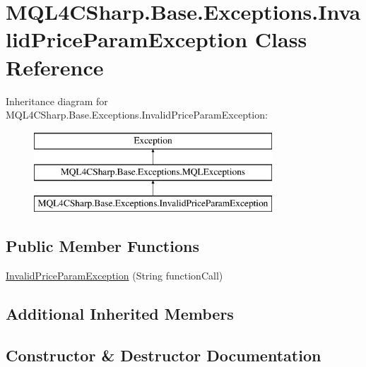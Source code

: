 \hypertarget{class_m_q_l4_c_sharp_1_1_base_1_1_exceptions_1_1_invalid_price_param_exception}{}\section{M\+Q\+L4\+C\+Sharp.\+Base.\+Exceptions.\+Invalid\+Price\+Param\+Exception Class Reference}
\label{class_m_q_l4_c_sharp_1_1_base_1_1_exceptions_1_1_invalid_price_param_exception}
Inheritance diagram for M\+Q\+L4\+C\+Sharp.\+Base.\+Exceptions.\+Invalid\+Price\+Param\+Exception\+:\begin{figure}[H]
\begin{center}
\leavevmode
\includegraphics[height=3.000000cm]{class_m_q_l4_c_sharp_1_1_base_1_1_exceptions_1_1_invalid_price_param_exception}
\end{center}
\end{figure}
\subsection*{Public Member Functions}
\begin{DoxyCompactItemize}
\item 
\hyperlink{class_m_q_l4_c_sharp_1_1_base_1_1_exceptions_1_1_invalid_price_param_exception_a826286b285ca0a6c66b42353b131c51b}{Invalid\+Price\+Param\+Exception} (String function\+Call)
\end{DoxyCompactItemize}
\subsection*{Additional Inherited Members}


\subsection{Constructor \& Destructor Documentation}
